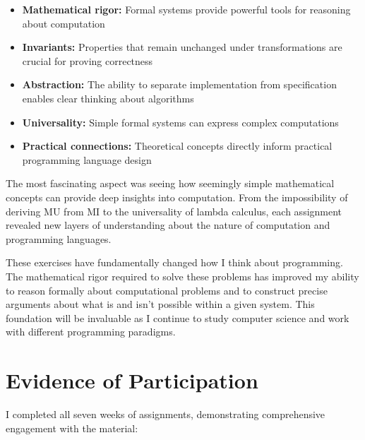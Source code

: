 \documentclass{article}
\theoremstyle{plain}
\theoremstyle{definition}
\theoremstyle{remark}
\begin{document}
\begin{itemize}
\item \textbf{Mathematical rigor:} Formal systems provide powerful tools for reasoning about computation
\item \textbf{Invariants:} Properties that remain unchanged under transformations are crucial for proving correctness
\item \textbf{Abstraction:} The ability to separate implementation from specification enables clear thinking about algorithms
\item \textbf{Universality:} Simple formal systems can express complex computations
\item \textbf{Practical connections:} Theoretical concepts directly inform practical programming language design
\end{itemize}

The most fascinating aspect was seeing how seemingly simple mathematical concepts can provide deep insights into computation. From the impossibility of deriving MU from MI to the universality of lambda calculus, each assignment revealed new layers of understanding about the nature of computation and programming languages.

These exercises have fundamentally changed how I think about programming. The mathematical rigor required to solve these problems has improved my ability to reason formally about computational problems and to construct precise arguments about what is and isn't possible within a given system. This foundation will be invaluable as I continue to study computer science and work with different programming paradigms.

\section{Evidence of Participation}

I completed all seven weeks of assignments, demonstrating comprehensive engagement with the material:
\end{document}
